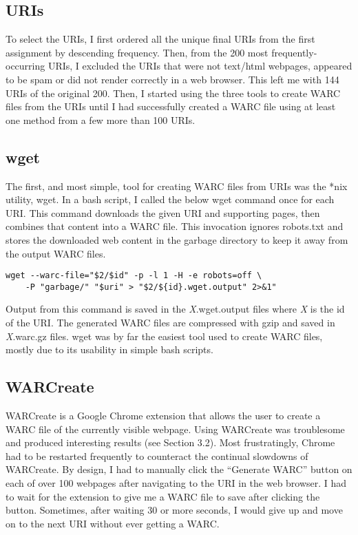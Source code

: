 \documentclass[a4paper,12pt]{article}
\begin{document}
\subsection{URIs}
To select the URIs, I first ordered all the unique final URIs from the first assignment by descending frequency.
Then, from the 200 most frequently-occurring URIs, I excluded the URIs that were not text/html webpages,
appeared to be spam or did not render correctly in a web browser. This left me with 144 URIs of the original
200. Then, I started using the three tools to create WARC files from the URIs until I had successfully created a
WARC file using at least one method from a few more than 100 URIs.

\subsection{wget}
The first, and most simple, tool for creating WARC files from URIs was the *nix utility, wget. In a bash script,
I called the below wget command once for each URI. This command downloads the given URI and supporting pages,
then combines that content into a WARC file. This invocation ignores robots.txt and stores the downloaded web
content in the garbage directory to keep it away from the output WARC files.
\begin{lstlisting}[basicstyle=\ttfamily,caption={Downloading Tweets}]
    wget --warc-file="$2/$id" -p -l 1 -H -e robots=off \
    -P "garbage/" "$uri" > "$2/${id}.wget.output" 2>&1"
\end{lstlisting}
Output from this command is saved in the \emph{X}.wget.output files where \emph{X} is the id of the URI. The
generated WARC files are compressed with gzip and saved in \emph{X}.warc.gz files. wget was by far the easiest
tool used to create WARC files, mostly due to its usability in simple bash scripts.

\subsection{WARCreate}
WARCreate is a Google Chrome extension that allows the user to create a WARC file of the currently visible
webpage. Using WARCreate was troublesome and produced interesting results (see Section 3.2). Most frustratingly,
Chrome had to be restarted frequently to counteract the continual slowdowns of WARCreate. By design, I had to
manually click the ``Generate WARC'' button on each of over 100 webpages after navigating to the URI in
the web browser. I had to wait for the extension to give
me a WARC file to save after clicking the button.
Sometimes, after waiting 30 or more seconds, I would give up and move on to the next URI without ever getting
a WARC.
\end{document}
